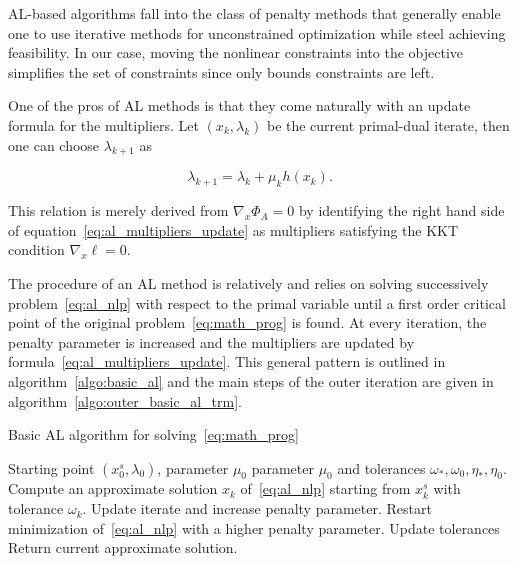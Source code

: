 \documentclass[10pt]{article}
\numberwithin{equation}{section}
\begin{document}
	 AL-based algorithms fall into the class of penalty methods that generally enable one to use iterative methods for unconstrained optimization  while steel achieving feasibility. In our case, moving the nonlinear constraints into the objective simplifies the set of constraints since only bounds constraints are left.
	 
	 One of the pros of AL methods is that they come naturally with an update formula for the multipliers. Let \((x_k,\lambda_k)\) be the current primal-dual iterate, then one can choose \(\lambda_{k+1} \) as
	 
	 \begin{equation}\label{eq:al_multipliers_update}
	 	\lambda_{k+1} = \lambda_k + \mu_kh(x_k).
	 \end{equation}
	 
	 This relation is merely derived from \(\nabla_x\Phi_A=0\) by identifying the right hand side of equation~\eqref{eq:al_multipliers_update} as multipliers satisfying the KKT condition \(\nabla_x \ell =0\).
	 
	 The procedure of an AL method is relatively  and relies on solving successively  problem~\eqref{eq:al_nlp} with respect to the primal variable until a first order critical point of the original problem~\eqref{eq:math_prog} is found. At every iteration, the penalty parameter is increased and the multipliers are updated by formula~\eqref{eq:al_multipliers_update}. This general pattern is outlined in algorithm~\ref{algo:basic_al} and the main steps of the outer iteration are given in  algorithm~\ref{algo:outer_basic_al_trm}.
	 
	 	\begin{algorithm}
	 		\caption{Basic AL algorithm for solving~\eqref{eq:math_prog}}\label{algo:basic_al}
	 		\begin{algorithmic}
	 			\Require Starting point $\left(x_0^s,\lambda_0\right)$, parameter $\mu_0$  parameter $\mu_0$ and tolerances $\omega_*,\omega_0,\eta_*,\eta_0$.
	 			\Repeat
	 			 \State Compute an approximate solution $x_{k}$ of~\eqref{eq:al_nlp} starting from \(x_k^s\) with tolerance $\omega_k$.
	 				\State Update iterate and increase penalty parameter.
	 				\Else
	 					\State Restart minimization of~\eqref{eq:al_nlp} with a higher penalty parameter.
	 			\EndIf
	 			\State Update tolerances
	 			\State Return current approximate solution.
	 		\end{algorithmic}
	 	\end{algorithm}
	 	
\end{document}
